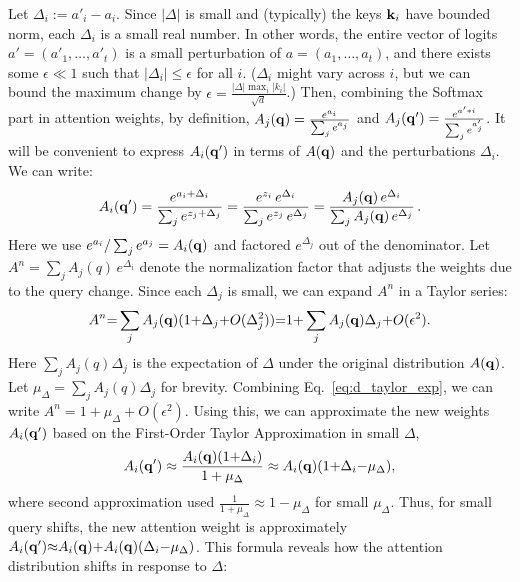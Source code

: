 Let $\Delta_i := a'_i - a_i$. Since $| \Delta |$ is small and (typically) the keys ${\mathbf{k}_i}$ have bounded norm, each $\Delta_i$ is a small real number. In other words, the entire vector of logits $a' = (a'_1,\dots,a'_t)$ is a small perturbation of $a = (a_1,\dots,a_t)$, and there exists some $\epsilon \ll 1$ such that $|\Delta_i| \le \epsilon$ for all $i$. ($\Delta_i$ might vary across $i$, but we can bound the maximum change by $\epsilon {=} \frac{|\Delta| \max_i|k_i|}{\sqrt{d}}$.) Then, combining the Softmax part in attention weights, by definition, $A_j(\mathbf{q}) = \frac{e^{a_i}}{\sum_j e^{a_j}}$ and $A_j(\mathbf{q}') = \frac{e^{a'*i}}{\sum_{j} e^{a'_j}}$. It will be convenient to express $A_i(\mathbf{q}')$ in terms of $A(\mathbf{q})$ and the perturbations $\Delta_i$. We can write:
\begin{equation}
   A_i(\mathbf{q}') = \frac{e^{a_i + \Delta_i}}{\sum_j e^{z_j + \Delta_j}} = \frac{e^{z_i}\,e^{\Delta_i}}{\sum_j e^{z_j}\,e^{\Delta_j}} = \frac{A_j(\mathbf{q})\,e^{\Delta_i}}{\sum_j A_j(\mathbf{q})\,e^{\Delta_j}}\,. 
\end{equation}
Here we use $e^{a_i}/\sum_j e^{a_j} = A_i(\mathbf{q})$ and factored $e^{\Delta_j}$ out of the denominator. Let $A^{n} = \sum_j A_j(q)\, e^{\Delta_i}$ denote the normalization factor that adjusts the weights due to the query change. Since each $\Delta_j$ is small, we can expand $A^{n}$ in a Taylor series:
\begin{equation}
\label{eq:d_taylor_exp}
\begin{aligned}
      A^{n} {=} \sum_j A_j(\mathbf{q})(1 {+} \Delta_j {+} O(\Delta_j^2)){=} 1 {+} \sum_j A_j(\mathbf{q})\Delta_j {+} O(\epsilon^2).  
\end{aligned}
\end{equation}
Here $\sum_j A_j(q)\Delta_j$ is the expectation of $\Delta$ under the original distribution $A(\mathbf{q})$. Let $\mu_\Delta {=} \sum_j A_j(q)\Delta_j$ for brevity. Combining Eq.~\eqref{eq:d_taylor_exp}, we can write $A^{n} {=} 1 {+} \mu_\Delta {+} O(\epsilon^2)$. Using this, we can approximate the new weights $A_i(\mathbf{q}')$ based on the First-Order Taylor Approximation in small $\Delta$,
\begin{equation}
\begin{aligned}
\label{eq:d_first_order_taylor}
    A_i(\mathbf{q}') \approx \frac{A_i(\mathbf{q})(1 {+} \Delta_i)}{1 + \mu_\Delta} \approx A_i(\mathbf{q})(1 {+} \Delta_i {-} \mu_\Delta),
\end{aligned}
\end{equation}
where second approximation used $\frac{1}{1+\mu_\Delta} \approx 1 - \mu_\Delta$ for small $\mu_\Delta$. Thus, for small query shifts, the new attention weight is approximately $A_i(\mathbf{q}') {\approx} A_i(\mathbf{q}) {+} A_i(\mathbf{q})(\Delta_i {-} \mu_\Delta)$. This formula reveals how the attention distribution shifts in response to $\Delta$:
